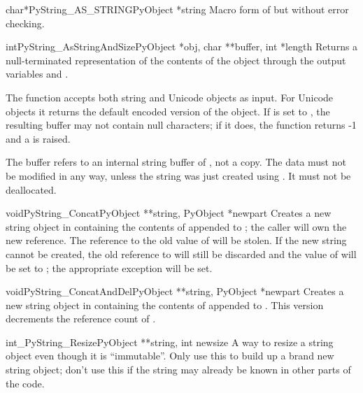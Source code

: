 \begin{cfuncdesc}{char*}{PyString_AS_STRING}{PyObject *string}
  Macro form of  but without error
  checking.
\end{cfuncdesc}

\begin{cfuncdesc}{int}{PyString_AsStringAndSize}{PyObject *obj,
                                                 char **buffer,
                                                 int *length}
  Returns a null-terminated representation of the contents of the
  object  through the output variables  and
  .

  The function accepts both string and Unicode objects as input. For
  Unicode objects it returns the default encoded version of the
  object.  If  is set to \NULL, the resulting buffer may
  not contain null characters; if it does, the function returns -1 and
  a  is raised.

  The buffer refers to an internal string buffer of , not a
  copy. The data must not be modified in any way, unless the string
  was just created using .  It must not be deallocated.
\end{cfuncdesc}

\begin{cfuncdesc}{void}{PyString_Concat}{PyObject **string,
                                         PyObject *newpart}
  Creates a new string object in  containing the contents
  of  appended to ; the caller will own the
  new reference.  The reference to the old value of  will
  be stolen.  If the new string cannot be created, the old reference
  to  will still be discarded and the value of
   will be set to \NULL; the appropriate exception will
  be set.
\end{cfuncdesc}

\begin{cfuncdesc}{void}{PyString_ConcatAndDel}{PyObject **string,
                                               PyObject *newpart}
  Creates a new string object in  containing the contents
  of  appended to .  This version decrements
  the reference count of .
\end{cfuncdesc}

\begin{cfuncdesc}{int}{_PyString_Resize}{PyObject **string, int newsize}
  A way to resize a string object even though it is ``immutable''.
  Only use this to build up a brand new string object; don't use this
  if the string may already be known in other parts of the code.
\end{cfuncdesc}

